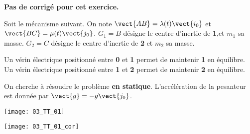 \normaltrue
\correctiontrue



\setcounter{question}{0}
\ifcorrection
\else
\textbf{Pas de corrigé pour cet exercice.}
\fi

\ifprof
\else
Soit le mécanisme suivant. On note $\vect{AB}=\lambda(t)\vect{i_0}$ et $\vect{BC}=\mu(t)\vect{j_0}$.
$G_1 = B$ désigne le centre d'inertie de \textbf{1},et $m_1$ sa masse. %
$G_2 = C$ désigne le centre d'inertie de \textbf{2} et  $m_2$ sa masse. %

 Un vérin électrique positionné entre \textbf{0} et \textbf{1} permet de maintenir \textbf{1} en équilibre.
 Un vérin électrique positionné entre \textbf{1} et \textbf{2} permet de maintenir \textbf{2} en équilibre.
 
 On cherche à résoudre le problème \textbf{en statique}.
L'accélération de la pesanteur est donnée par $\vect{g}=-g\vect{j_0}$.



\begin{center}
\texttt{[image: 03\_TT\_01]}
\end{center}
\fi

\ifprof
\begin{center}
\texttt{[image: 03\_TT\_01\_cor]}
\end{center}

\else
\fi




\ifprof
\else
\fi

\ifprof
\else
\fi

